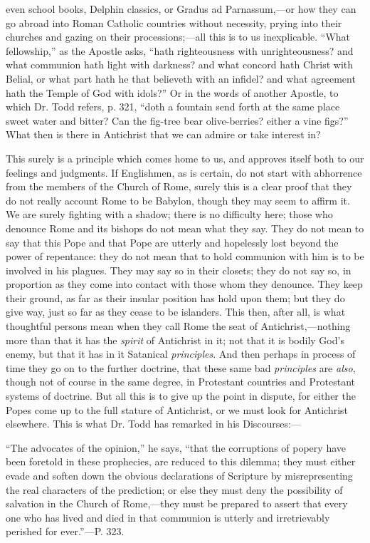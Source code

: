 even school books, Delphin classics, or Gradus ad Parnassum,—or how
they can go abroad into Roman Catholic countries without necessity,
prying into their churches and gazing on their processions;—all this
is to us inexplicable. ``What fellowship,'' as the Apostle
asks, ``hath righteousness with unrighteousness? and what
communion hath light with darkness? and what concord hath Christ with
Belial, or what part hath he that believeth with an infidel? and what
agreement hath the Temple of God with idols?'' Or in the words of
another Apostle, to which Dr. Todd refers, p. 321, ``doth a
fountain send forth at the same place sweet water and bitter? Can the
fig-tree bear olive-berries? either a vine figs?'' What then is
there in Antichrist that we can admire or take interest in?

This surely is a principle which comes home to us, and approves
itself both to our feelings and judgments. If Englishmen, as is
certain, do not start with abhorrence from the members of the Church
of Rome, surely this is a clear proof that they do not really account
Rome to be Babylon, though they may seem to affirm it. We are surely
fighting with a shadow; there is no difficulty here; those who
denounce Rome and its bishops do not mean what they say. They do not
mean to say that this Pope and that Pope are utterly and hopelessly
lost beyond the power of repentance: they do not mean that to
hold communion with him is to be involved in his plagues. They may say
so in their closets; they do not say so, in proportion as they come
into contact with those whom they denounce. They keep their ground, as
far as their insular position has hold upon them; but they do give
way, just so far as they cease to be islanders. This then, after all,
is what thoughtful persons mean when they call Rome the seat of
Antichrist,—nothing more than that it has the \emph{spirit} of
Antichrist in it; not that it is bodily God's enemy, but that it has
in it Satanical \emph{principles}. And then perhaps in process of time
they go on to the further doctrine, that these same bad \emph{principles}
are \emph{also}, though not of course in the same degree, in
Protestant countries and Protestant systems of doctrine. But all this
is to give up the point in dispute, for either the Popes come up to
the full stature of Antichrist, or we must look for Antichrist
elsewhere. This is what Dr. Todd has remarked in his Discourses:—

``The advocates of the opinion,'' he says, ``that the
corruptions of popery have been foretold in these prophecies, are
reduced to this dilemma; they must either evade and soften down the
obvious declarations of Scripture by misrepresenting the real
characters of the prediction; or else they must deny the possibility
of salvation in the Church of Rome,—they must be prepared to assert
that every one who has lived and died in that communion is utterly and
irretrievably perished for ever.''—P. 323.

